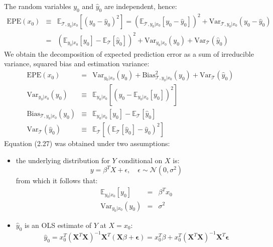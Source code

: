 

The random variables $y_0$ and $\hat{y}_0$ are independent, hence:
\begin{eqnarray*}
    \textrm{EPE}(x_0) & \equiv & \mathbb{E}_{\mathcal{T}, y_0|x_0} \left[ (y_0 - \hat{y}_0)^2 \right] = \left( \mathbb{E}_{\mathcal{T}, y_0|x_0} \left[ y_0 - \hat{y}_0 \right] \right) ^2 + \textrm{Var}_{\mathcal{T}, y_0|x_0} \left( y_0 - \hat{y}_0 \right) \\
    & = & \left( \mathbb{E}_{y_0 | x_0}\left[y_0\right] - \mathbb{E}_{\mathcal{T}}\left[\hat{y}_0 \right] \right)^2 + \textrm{Var}_{y_0 | x_0} (y_0) + \textrm{Var}_{\mathcal{T}}(\hat{y}_0) 
\end{eqnarray*}
We obtain the decomposition of expected prediction error as a sum of irreducible variance, squared bias and estimation variance:
\begin{eqnarray}
\textrm{EPE}(x_0) & = & \textrm{Var}_{y_0 | x_0} (y_0) + \textrm{Bias}_{\mathcal{T}, y_0 | x_0}^2(y_0) + \textrm{Var}_\mathcal{T}(\hat{y}_0)\\
\textrm{Var}_{y_0 | x_0} (y_0) & \equiv & \mathbb{E}_{y_0 | x_0}\left[\left(y_0 - \mathbb{E}_{y_0 | x_0}\left[y_0\right]\right)^2 \right]\\
\textrm{Bias}_{\mathcal{T}, y_0 | x_0}(y_0) & \equiv & \mathbb{E}_{y_0 | x_0}\left[y_0\right] - \mathbb{E}_{\mathcal{T}}\left[\hat{y}_0 \right] \\
\textrm{Var}_\mathcal{T}(\hat{y}_0) & \equiv & \mathbb{E}_{\mathcal{T}}\left[\left(\mathbb{E}_{\mathcal{T}}\left[\hat{y}_0 \right] - \hat{y}_0 \right)^2 \right]
\end{eqnarray}
Equation (2.27) was obtained under two assumptions:
\begin{itemize}
    \item the underlying distribution for $Y$ conditional on $X$ is:
    $$
    y = \beta ^T X + \epsilon, \quad \epsilon \sim \mathcal{N}(0, \sigma^2)
    $$
    from which it follows that:
    \begin{eqnarray*}
        \mathbb{E}_{y_0 | x_0}\left[y_0\right] & = & \beta ^T x_0\\
        \textrm{Var}_{y_0 | x_0} (y_0) & = & \sigma^2
    \end{eqnarray*}
    \item $\hat{y}_0$ is an OLS estimate of $Y$ at $X = x_0$:
    $$
    \hat{y}_0 = x_0 ^T \left(\mathbf{X}^T \mathbf{X} \right)^{-1} \mathbf{X}^T \left(\mathbf{X} \beta + \bm{\epsilon}\right) = x_0 ^T \beta + x_0^T \left(\mathbf{X}^T \mathbf{X} \right)^{-1} \mathbf{X}^T \bm{\epsilon}
    $$
\end{itemize}

